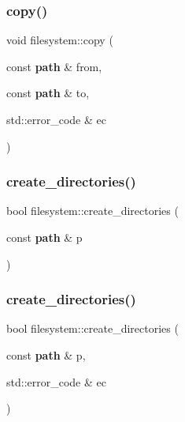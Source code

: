 \mbox{\label{namespacefilesystem_a844ab86f9f90f11dd3a406d80e6294bd}} 
\subsubsection{copy()\hspace{0.1cm}{\footnotesize\ttfamily [2/2]}}
{\footnotesize\ttfamily void filesystem\+::copy (\begin{DoxyParamCaption}\item[{const \textbf{ path} \&}]{from,  }\item[{const \textbf{ path} \&}]{to,  }\item[{std\+::error\+\_\+code \&}]{ec }\end{DoxyParamCaption})}

\mbox{\label{namespacefilesystem_a02544035cdec4e720ec4431d5a5e7af8}} 
\subsubsection{create\_directories()\hspace{0.1cm}{\footnotesize\ttfamily [1/2]}}
{\footnotesize\ttfamily bool filesystem\+::create\+\_\+directories (\begin{DoxyParamCaption}\item[{const \textbf{ path} \&}]{p }\end{DoxyParamCaption})}

\mbox{\label{namespacefilesystem_a3341d7eef82ce8e93ae0d75e7f6395c4}} 
\subsubsection{create\_directories()\hspace{0.1cm}{\footnotesize\ttfamily [2/2]}}
{\footnotesize\ttfamily bool filesystem\+::create\+\_\+directories (\begin{DoxyParamCaption}\item[{const \textbf{ path} \&}]{p,  }\item[{std\+::error\+\_\+code \&}]{ec }\end{DoxyParamCaption})}

\mbox{\label{namespacefilesystem_a9e291e4379f5f063edd3a37fb623a536}} 
